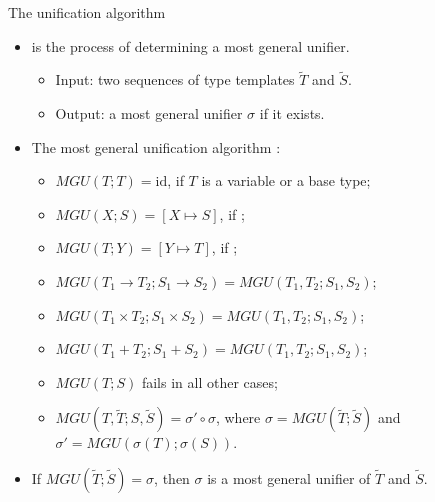 \documentclass[paper=screen,mode=present,style=zysimple]{powerdot}
\begin{document}
\begin{slide}{The unification algorithm}
\begin{itemize}
\item {} is the process of determining a most general unifier.
\vspace*{-0.5em}
\begin{itemize}\small
\item Input: two sequences of type templates $\tilde T$ and $\tilde S$.
\item Output: a most general unifier $\sigma$ if it exists.
\vspace*{-1em}
\end{itemize}
\item The most general unification algorithm :
\vspace*{-0.5em}
\begin{itemize}\small
\item $MGU(T; T) = \mathrm{id}$, if $T$ is a variable or a base type;
\item $MGU(X; S) = [ X \mapsto S ]$, if ;
\item $MGU(T; Y) = [ Y \mapsto T ]$, if ;
\item $MGU(T_1 \to T_2; S_1 \to S_2) = MGU (T_1, T_2; S_1, S_2)$;
\item $MGU(T_1 \times T_2; S_1 \times S_2) = MGU (T_1, T_2; S_1, S_2)$;
\item $MGU(T_1 + T_2; S_1 + S_2) = MGU (T_1, T_2; S_1, S_2)$;
\item $MGU(T; S)$ fails in all other cases;
\item $MGU(T, \tilde T; S, \tilde S) = \sigma' \circ \sigma$, where $\sigma = MGU(\tilde T; \tilde S)$ 
  and $\sigma' = MGU(\sigma(T); \sigma(S))$.
\vspace*{-0.5em}
\end{itemize}
\item If $MGU(\tilde T; \tilde S) = \sigma$, then $\sigma$ is a most general unifier of $\tilde T$ 
  and $\tilde S$.
\end{itemize}
\end{slide}
\end{document}
